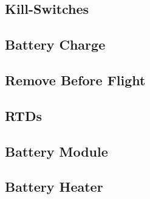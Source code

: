 \subsection{Kill-Switches}

\subsection{Battery Charge}

\subsection{Remove Before Flight}

\subsection{RTDs}

\subsection{Battery Module}

\subsection{Battery Heater}
